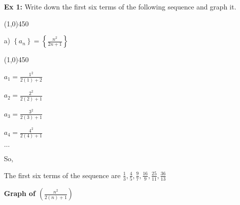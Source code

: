 \documentclass{report}
\begin{document}
\begin{large}
	\begin{center}
	  
	\noindent \textbf{Ex 1:} 
	Write down the first six terms of the following sequence and graph it.
	\end{center}
\end{large}
\bigbreak \noindent

 \line(1,0){450}

\begin{center}
\begin{large}
	{\LARGE{a)}} $\left\{a_n\right\}=\left\{\frac{n^{2}}{2n+1}\right\}$
\end{large}
\end{center}

\line(1,0){450}

\begin{center}
 $a_1 = \frac{1^2}{2(1) + 2}$
 \vspace{2mm}

 $a_2 = \frac{2^2}{2(2)+1}$
 \vspace{2mm} 

 $a_3 = \frac{3^2}{2(3)+1}$
 \vspace{2mm}

 $a_4 = \frac{4^2}{2(4)+1}$
 \vspace{2mm}

 $\ldots$
\end{center}

So,
\vspace{4mm}

The first six terms of the sequence are $\frac{1}{3},\frac{4}{5}, \frac{9}{7}, \frac{16}{9}, \frac{25}{11},\frac{36}{13}$
\vspace{5mm}

\begin{center}

	\textbf{Graph of $\left(\frac{n^2}{2(n)+1}\right)$}

\end{center}
\bigbreak \noindent \bigbreak \noindent
\end{document}
